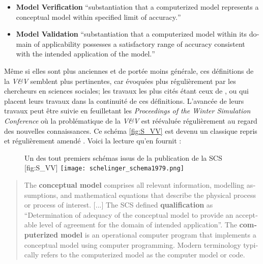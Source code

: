 \begin{itemize}
\item \textbf{Model Verification} \foreignquote{english}{substantiation that a computerized model represents a conceptual model within specified limit of accuracy.}
\item \textbf{Model Validation} \foreignquote{english}{substantiation that a computerized model within its domain of applicability possesses a satisfactory range of accuracy consistent with the intended application of the model.}
\end{itemize}

Même si elles sont plus anciennes et de portée moins générale, ces définitions de la \textit{V\&V} semblent plus pertinentes, car évoquées plus régulièrement par les chercheurs en sciences sociales; les travaux les plus cités étant ceux de \textcite{Kleijnen1995}, ou \textcite{Sargent2010} qui placent leurs travaux dans la continuité de ces définitions. L'avancée de leurs travaux peut être suivie en feuilletant les \textit{Proceedings of the Winter Simulation Conference} où la problématique de la \textit{V\&V} est réévaluée régulièrement au regard des nouvelles connaissances. Ce schéma \ref{fig:S_VV} est devenu un classique repris et régulièrement amendé \autocite{Sargent2010}. Voici la lecture qu'en fournit \autocite{Oberkampf2010} :

\begin{figure}[htbp]
	\begin{sidecaption}{Un des tout premiers schémas issus de la publication de la SCS \autocites{Oberkampf2010,Schlesinger1979}}[fig:S_VV]
	  \centering
	 \texttt{[image: schelinger\_schema1979.png]}
	  \end{sidecaption}
\end{figure}

\foreignblockquote{english}[\cite{Oberkampf2010}]{The \textbf{conceptual model} comprises all relevant information, modelling assumptions, and mathematical equations that describe the physical process or process of interest. [...] The SCS defined \textbf{qualification} as \enquote{Determination of adequacy of the conceptual model to provide an acceptable level of agreement for the domain of intended application}. The \textbf{computerized model} is an operational computer program that implements a conceptual model using computer programming. Modern terminology typically refers to the computerized model as the computer model or code.}

